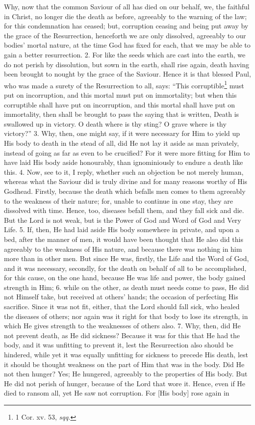 Why, now that the common Saviour of all has died on our behalf, we, the faithful in Christ, no longer die the death as before, agreeably to the warning of the law; for this condemnation has ceased; but, corruption ceasing and being put away by the grace of the Resurrection, henceforth we are only dissolved, agreeably to our bodies’ mortal nature, at the time God has fixed for each, that we may be able to gain a better resurrection. 2. For like the seeds which are cast into the earth, we do not perish by dissolution, but sown in the earth, shall rise again, death having been brought to nought by the grace of the Saviour. Hence it is that blessed Paul, who was made a surety of the Resurrection to all, says: “This corruptible\footnote{1 Cor. xv. 53, \emph{sqq.}} must put on incorruption, and this mortal must put on immortality; but when this corruptible shall have put on incorruption, and this mortal shall have put on immortality, then shall be brought to pass the saying that is written, Death is swallowed up in victory. O death where is thy sting? O grave where is thy victory?” 3. Why, then, one might say, if it were necessary for Him to yield up His body to death in the stead of all, did He not lay it aside as man privately, instead of going as far as even to be crucified? For it were more fitting for Him to have laid His body aside honourably, than ignominiously to endure a death like this. 4. Now, see to it, I reply, whether such an objection be not merely human, whereas what the Saviour did is truly divine and for many reasons worthy of His Godhead. Firstly, because the death which befalls men comes to them agreeably to the weakness of their nature; for, unable to continue in one stay, they are dissolved with time. Hence, too, diseases befall them, and they fall sick and die. But the Lord is not weak, but is the Power of God and Word of God and Very Life. 5. If, then, He had laid aside His body somewhere in private, and upon a bed, after the manner of men, it would have been thought that He also did this agreeably to the weakness of His nature, and because there was nothing in him more than in other men. But since He was, firstly, the Life and the Word of God, and it was necessary, secondly, for the death on behalf of all to be accomplished, for this cause, on the one hand, because He was life and power, the body gained strength in Him; 6. while on the other, as death must needs come to pass, He did not Himself take, but received at others’ hands; the occasion of perfecting His sacrifice. Since it was not fit, either, that the Lord should fall sick, who healed the diseases of others; nor again was it right for that body to lose its strength, in which He gives strength to the weaknesses of others also. 7. Why, then, did He not prevent death, as He did sickness? Because it was for this that He had the body, and it was unfitting to prevent it, lest the Resurrection also should be hindered, while yet it was equally unfitting for sickness to precede His death, lest it should be thought weakness on the part of Him that was in the body. Did He not then hunger? Yes; He hungered, agreeably to the properties of His body. But He did not perish of hunger, because of the Lord that wore it. Hence, even if He died to ransom all, yet He saw not corruption. For [His body] rose again in 